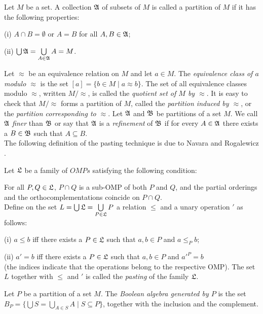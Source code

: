 \begin{defin}
Let $M$ be a set. A collection ${\frak A}$ of subsets of $M$ is called
a partition of $M$ if it has the following properties:

(i) $A \cap B = \emptyset$ or $A = B$ for all $A,B \in {\frak A}$;

(ii) $\bigcup {\frak A} = \bigcup\limits_{A \in {\frak A}} A = M$.
\end{defin}

Let $\approx$ be an equivalence relation on $M$ and let $a \in M$.
The {\em equivalence class of $a$ modulo $\approx$} is the set
$[a] = \{b \in M\mid a \approx b\}$.
The set of all equivalence classes modulo $\approx$,
written $M/\approx$, is called the {\em quotient set of $M$ by $\approx$}.
It is easy to check that $M/\approx$ forms a partition of $M$,
called the {\em partition induced by $\approx$}, or the
{\em partition corresponding to $\approx$}.
Let ${\frak A}$ and ${\frak B}$ be partitions of a set $M$.
We call ${\frak A}$ {\em finer} than ${\frak B}$ or say that
${\frak A}$ is a {\em refinement} of ${\frak B}$ if for every $A \in {\frak A}$
there exists a $B \in {\frak B}$ such that $A \subseteq B$. \\

The following definition of the pasting technique is due
to Navara and Rogalewicz \cite{navara}.

\begin{defin}
Let ${\frak L}$ be a family of $OMPs$ satisfying the following condition:

For all $P,Q \in {\frak L}$, $P \cap Q$ is a sub-OMP of both $P$ and $Q$,
and the partial orderings and the orthocomplementations coincide on
$P \cap Q$. \\
Define on the set $L = \bigcup {\frak L} = \bigcup\limits_{P \in {\frak L}} P$
a relation $\le$ and a unary operation $'$ as follows:

(i) $a \le b$ iff there exists a $P \in {\frak L}$ such that
$a,b \in P$ and $a \le_P b$;

(ii) $a' = b$ iff there exists a $P \in {\frak L}$ such that
$a,b \in P$ and $a'^P = b$ \\
(the indices indicate that the operations belong to the respective OMP).
The set $L$ together with $\le$ and $'$ is called the {\em pasting} of
the family ${\frak L}$.
\end{defin}

Let $P$ be a partition of a set $M$.
The {\em Boolean algebra generated by $P$} is the set
$B_P = \{ \bigcup S = \bigcup\limits_{A \in S} A \mid S \subseteq P\}$, together
with the inclusion and the complement.

